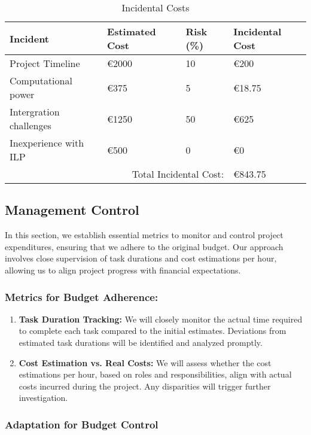 \begin{table}[!ht]
    \centering
    \begin{tabular}{|l|l|l|l|}
    \hline
    \rowcolor{black!25}
        Incident & Estimated Cost & Risk (\%) & Incidental Cost \\ \hline
        Project Timeline & €2000 & 10 & €200 \\ \hline
        Computational power & €375 & 5 & €18.75 \\ \hline
        Intergration challenges & €1250 & 50 & €625 \\ \hline
        Inexperience with ILP & €500 & 0 & €0 \\ \hline
        \multicolumn{3}{r|}{Total Incidental Cost:}& €843.75 \\ \cline{4-4}
    \end{tabular}
    \caption{Incidental Costs}
    \label{tab:incidentalCost}
\end{table}

\subsection{Management Control}
In this section, we establish essential metrics to monitor and control project expenditures, ensuring that we adhere to the original budget. Our approach involves close supervision of task durations and cost estimations per hour, allowing us to align project progress with financial expectations.

\subsubsection{Metrics for Budget Adherence:}
\begin{enumerate}
    \item \textbf{Task Duration Tracking:} We will closely monitor the actual time required to complete each task compared to the initial estimates. Deviations from estimated task durations will be identified and analyzed promptly.
    
    \item \textbf{Cost Estimation vs. Real Costs:} We will assess whether the cost estimations per hour, based on roles and responsibilities, align with actual costs incurred during the project. Any disparities will trigger further investigation.
\end{enumerate}

\subsubsection{Adaptation for Budget Control}

